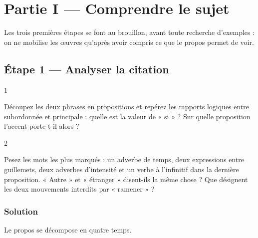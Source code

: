 \documentclass[11pt,a4paper]{article}
\begin{document}
\hypertarget{partie-i-comprendre-le-sujet}{%
\section{Partie I --- Comprendre le sujet}\label{partie-i-comprendre-le-sujet}}

Les trois premières étapes se font au brouillon, avant toute recherche d'exemples : on ne mobilise les œuvres qu'après avoir compris ce que le propos permet de voir.

\hypertarget{uxe9tape-1-analyser-la-citation}{%
\subsection{Étape 1 --- Analyser la citation}\label{uxe9tape-1-analyser-la-citation}}

\begin{indication}{1}

Découpez les deux phrases en propositions et repérez les rapports logiques entre subordonnée et principale : quelle est la valeur de « si » ? Sur quelle proposition l'accent porte-t-il alors ?

\end{indication}

\begin{indication}{2}

Pesez les mots les plus marqués : un adverbe de temps, deux expressions entre guillemets, deux adverbes d'intensité et un verbe à l'infinitif dans la dernière proposition. « Autre » et « étranger » disent-ils la même chose ? Que désignent les deux mouvements interdits par « ramener » ?

\end{indication}

\hypertarget{solution}{%
\subsubsection{Solution}\label{solution}}

Le propos se décompose en quatre temps.
\end{document}
